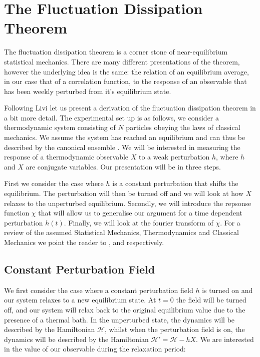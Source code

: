 \section{The Fluctuation Dissipation Theorem}

The fluctuation dissipation theorem is a corner stone of near-equilibrium statistical mechanics. There are many different presentations of the theorem, however the underlying idea is the same: the relation of an equilibrium average, in our case that of a correlation function, to the response of an observable that has been weekly perturbed from it's equilibrium state.

Following Livi \cite{LiviPoliti2017} let us present a derivation of the fluctuation dissipation theorem in a bit more detail. The experimental set up is as follows, we consider a thermodynamic system consisting of $N$ particles obeying the laws of classical mechanics. We assume the system has reached an equilibrium and can thus be described by the canonical ensemble \cite{Greiner1995}. We will be interested in measuring the response of a thermodynamic observable $X$ to a weak perturbation $h$, where $h$ and $X$ are conjugate variables. Our presentation will be in three steps.

First we consider the case where $h$ is a constant perturbation that shifts the equilibrium. The perturbation will then be turned off and we will look at how $X$ relaxes to the unperturbed equilibrium. Secondly, we will introduce the repsonse function $\chi$ that will allow us to generalise our argument for a time dependent perturbation $h(t)$. Finally, we will look at the fourier transform of $\chi$. For a review of the assumed Statistical Mechanics, Thermodynamics and Classical Mechanics we point the reader to \cite{Greiner1995}, \cite{JudithA.McGovern2016} and \cite{JohnBaez} respectively.\\

\subsection{Constant Perturbation Field}

We first consider the case where a constant perturbation field $h$ is turned on and our system relaxes to a new equilibrium state. At $t = 0$ the field will be turned off, and our system will relax back to the original equilibrium value due to the presence of a thermal bath. In the unperturbed state, the dynamics will be described by the Hamiltonian $\mathcal{H}$, whilst when the perturbation field is on, the dynamics will be described by the Hamiltonian $\mathcal{H}' = \mathcal{H} -hX$. We are interested in the value of our observable during the relaxation period:

